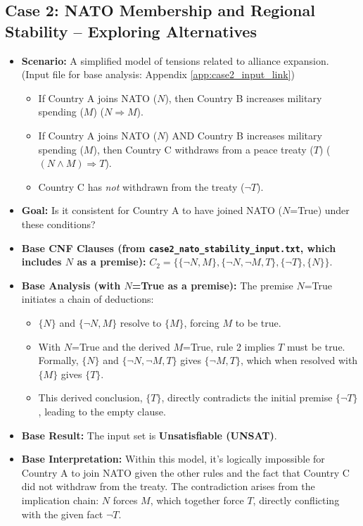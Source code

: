 \documentclass[11pt, a4paper]{article}
\begin{document}
\subsection*{Case 2: NATO Membership and Regional Stability – Exploring Alternatives}
\begin{itemize}
    \item \textbf{Scenario:} A simplified model of tensions related to alliance expansion. (Input file for base analysis: Appendix \ref{app:case2_input_link})
    \begin{itemize}
        \item If Country A joins NATO ($N$), then Country B increases military spending ($M$) ($N \Rightarrow M$).
        \item If Country A joins NATO ($N$) AND Country B increases military spending ($M$), then Country C withdraws from a peace treaty ($T$) ($(N \wedge M) \Rightarrow T$).
        \item Country C has \textit{not} withdrawn from the treaty ($\neg T$).
    \end{itemize}
    \item \textbf{Goal:} Is it consistent for Country A to have joined NATO ($N$=True) under these conditions?
    \item \textbf{Base CNF Clauses (from \texttt{case2\_nato\_stability\_input.txt}, which includes $N$ as a premise):} $C_2 = \{\{\neg N, M\}, \{\neg N, \neg M, T\}, \{\neg T\}, \{N\}\}$.
    \item \textbf{Base Analysis (with $N$=True as a premise):}
        The premise $N$=True initiates a chain of deductions:
        \begin{itemize}
            \item $\{N\}$ and $\{\neg N, M\}$ resolve to $\{M\}$, forcing $M$ to be true.
            \item With $N$=True and the derived $M$=True, rule 2 implies $T$ must be true. Formally, $\{N\}$ and $\{\neg N, \neg M, T\}$ gives $\{\neg M, T\}$, which when resolved with $\{M\}$ gives $\{T\}$.
            \item This derived conclusion, $\{T\}$, directly contradicts the initial premise $\{\neg T\}$, leading to the empty clause.
        \end{itemize}
    \item \textbf{Base Result:} The input set is \textbf{Unsatisfiable (UNSAT)}.
    \item \textbf{Base Interpretation:} Within this model, it's logically impossible for Country A to join NATO given the other rules and the fact that Country C did not withdraw from the treaty. The contradiction arises from the implication chain: $N$ forces $M$, which together force $T$, directly conflicting with the given fact $\neg T$.
\end{itemize}
\end{document}
